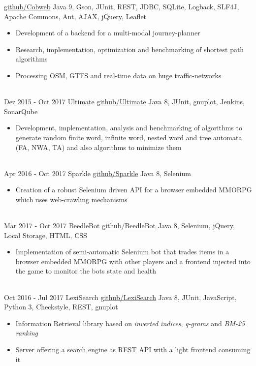 \documentclass[letterpaper]{twentysecondcv} %
\begin{document}
\begin{twenty}
        		{\href{https://github.com/Zabuzard/Cobweb}{github/Cobweb}}
        		{Java 9, Gson, JUnit, REST, JDBC, SQLite, Logback, SLF4J, Apache Commons, Ant, AJAX, jQuery, Leaflet}
        		{\begin{itemize}
        			\item Development of a backend for a multi-modal journey-planner
        			\item Research, implementation, optimization and benchmarking of shortest path algorithms
        			\item Processing OSM, GTFS and real-time data on huge traffic-networks
        		\end{itemize}}\\
	\twentyitem
    		{Dez 2015 -}
		{Oct 2017}
        		{Ultimate}
        		{\href{https://github.com/ultimate-pa/ultimate}{github/Ultimate}}
        		{Java 8, JUnit, gnuplot, Jenkins, SonarQube}
        		{\begin{itemize}
        			\item Development, implementation, analysis and benchmarking of algorithms to generate random finite word,
        			infinite word, nested word and tree automata (FA, NWA, TA) and also algorithms to minimize them
        		\end{itemize}}\\
	\twentyitem
    		{Apr 2016 -}
		{Oct 2017}
        		{Sparkle}
        		{\href{https://github.com/Zabuzard/Sparkle}{github/Sparkle}}
        		{Java 8, Selenium}
        		{\begin{itemize}
        			\item Creation of a robust Selenium driven API for a browser embedded MMORPG which uses web-crawling mechanisms
        		\end{itemize}}\\
	\twentyitem
    		{Mar 2017 -}
		{Oct 2017}
        		{BeedleBot}
        		{\href{https://github.com/Zabuzard/BeedleBot}{github/BeedleBot}}
        		{Java 8, Selenium, jQuery, Local Storage, HTML, CSS}
        		{\begin{itemize}
        			\item Implementation of semi-automatic Selenium bot that trades items in a browser embedded MMORPG
	        			with other players and a frontend injected into the game to monitor the bots state and health
        		\end{itemize}}\\
	\twentyitem
    		{Oct 2016 -}
		{Jul 2017}
        		{LexiSearch}
        		{\href{https://github.com/Zabuzard/LexiSearchExercises}{github/LexiSearch}}
        		{Java 8, JUnit, JavaScript, Python 3, Checkstyle, REST, gnuplot}
        		{\begin{itemize}
        			\item Information Retrieval library based on \textit{inverted indices}, \textit{q-grams} and \textit{BM-25 ranking}
        			\item Server offering a search engine as REST API with a light frontend consuming it
        		\end{itemize}}
\end{twenty}
\end{document}
